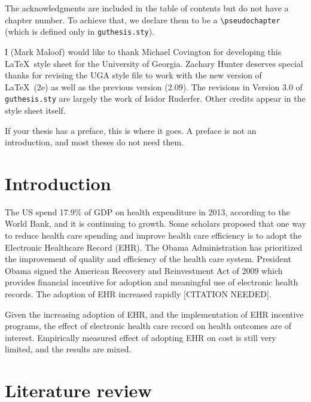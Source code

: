 \documentclass[12pt]{report}
\begin{document}
The acknowledgments are included in the table of contents but do
not have a chapter number.  To achieve that, we
declare them to be a \verb"\pseudochapter" (which is defined only in
\verb"guthesis.sty").

I (Mark Maloof) would like to thank Michael Covington for developing
this \LaTeX\ style sheet for the University of Georgia.
Zachary Hunter deserves special thanks for revising the UGA style
file to work with the new version of \LaTeX\ (2e) as well as the
previous version (2.09).
The revisions in
Version 3.0 of \verb"guthesis.sty" are
largely the work of Isidor Ruderfer.
Other credits appear in the style sheet itself.


If your thesis has a preface, this is where it goes.
A preface is not an introduction, and most theses do not need them.


\tableofcontents

\listoffigures  %
\listoftables   %

\newpage

\chapter{Introduction}
The US spend 17.9\% of GDP on health expenditure in 2013, according to the World Bank, and it is continuing to growth. Some scholars proposed that one way to reduce health care spending and improve health care efficiency is to adopt the Electronic Healthcare Record (EHR). The Obama Administration has prioritized the improvement of quality and efficiency of the health care system. President Obama signed the American Recovery and Reinvestment Act of 2009 which provides financial incentive for adoption and meaningful use of electronic health records. The adoption of EHR increased rapidly [CITATION NEEDED].

Given the increasing adoption of EHR, and the implementation of EHR incentive programs, the effect of electronic health care record on health outcomes are of interest. Empirically measured effect of adopting EHR on cost is still very limited, and the results are mixed.

\chapter{Literature review}
\end{document}
